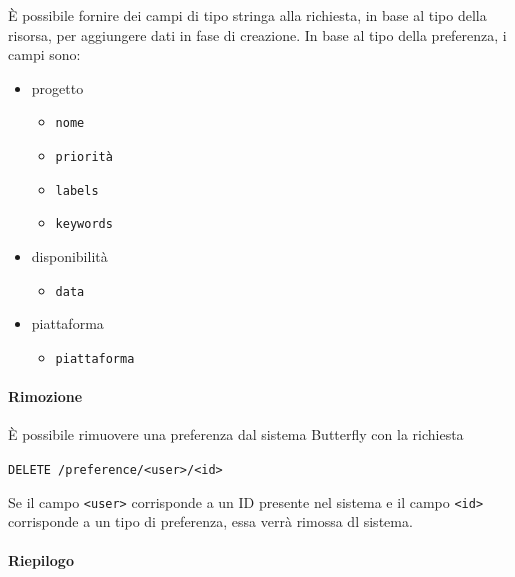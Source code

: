 È possibile fornire dei campi di tipo stringa alla richiesta, in base al tipo della risorsa, per aggiungere dati in fase di creazione.
In base al tipo della preferenza, i campi sono:
\begin{itemize}[noitemsep]
    \item progetto
        \begin{itemize}[noitemsep]
            \item \texttt{nome}
            \item \texttt{priorità}
            \item \texttt{labels}
            \item \texttt{keywords}
        \end{itemize}
    \item disponibilità
        \begin{itemize}[noitemsep]
            \item \texttt{data}
        \end{itemize}
    \item piattaforma
        \begin{itemize}[noitemsep]
            \item \texttt{piattaforma}
        \end{itemize}
\end{itemize}


\paragraph{Rimozione}

È possibile rimuovere una preferenza dal sistema Butterfly con la richiesta
\begin{center}
    \texttt{DELETE /preference/<user>/<id>}
\end{center}

Se il campo \texttt{<user>} corrisponde a un ID presente nel sistema e il campo \texttt{<id>} corrisponde a un tipo di preferenza, essa verrà rimossa dl sistema.

\paragraph{Riepilogo}

